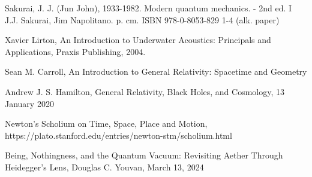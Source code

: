 {\begin{thebibliography}{99}
   	 Sakurai, J. J. (Jun John), 1933-1982. Modern quantum mechanics. - 2nd ed. I J.J. Sakurai, Jim Napolitano. p. cm. ISBN 978-0-8053-829 1-4 (alk. paper)

	 Xavier Lirton, An Introduction to Underwater Acoustics: Principals and Applications, Praxis Publishing, 2004.

	 Sean M. Carroll, An Introduction to General Relativity: Spacetime and Geometry

 	 Andrew J. S. Hamilton, General Relativity, Black Holes, and Cosmology, 13 January 2020
	
	 Newton's Scholium on Time, Space, Place and Motion, https://plato.stanford.edu/entries/newton-stm/scholium.html

	 Being, Nothingness, and the Quantum Vacuum: Revisiting Aether Through Heidegger's Lens, Douglas C. Youvan, March 13, 2024
\end{thebibliography}
}
